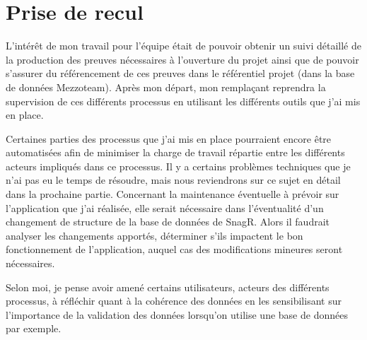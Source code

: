 \newpage

\section{Prise de recul}
L'intérêt de mon travail pour l'équipe était de pouvoir obtenir un suivi détaillé de la production des preuves nécessaires à l'ouverture du projet ainsi que de pouvoir s'assurer du référencement de ces preuves dans le référentiel projet (dans la base de données \gls{Mezzoteam}). Après mon départ, mon remplaçant reprendra la supervision de ces différents processus en utilisant les différents outils que j'ai mis en place.

Certaines parties des processus que j'ai mis en place pourraient encore être automatisées afin de minimiser la charge de travail répartie entre les différents acteurs impliqués dans ce processus.
Il y a certains problèmes techniques que je n'ai pas eu le temps de résoudre, mais nous reviendrons sur ce sujet en détail dans la prochaine partie.
Concernant la maintenance éventuelle à prévoir sur l'application que j'ai réalisée, elle serait nécessaire dans l'éventualité d'un changement de structure de la base de données de \gls{SnagR}.
Alors il faudrait analyser les changements apportés, déterminer s’ils impactent le bon fonctionnement de l'application, auquel cas des modifications mineures seront nécessaires.


Selon moi, je pense avoir amené certains utilisateurs, acteurs des différents processus, à réfléchir quant à la cohérence des données en les sensibilisant sur l'importance de la validation des données lorsqu'on utilise une base de données par exemple.
